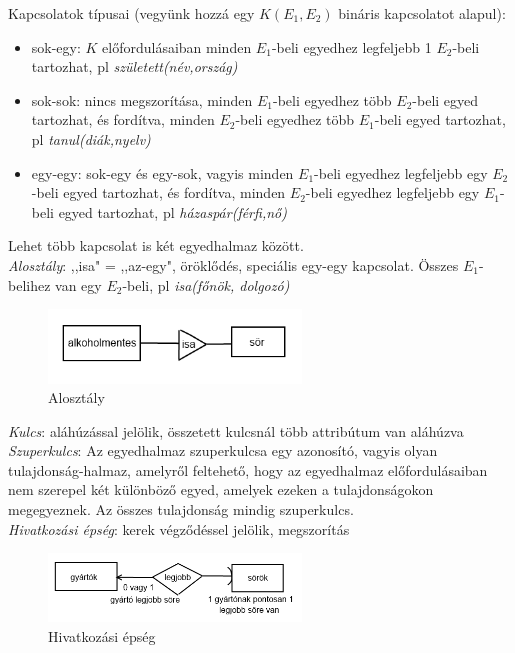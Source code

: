 \documentclass[margin=0px]{article}
\begin{document}
Kapcsolatok típusai (vegyünk hozzá egy $K(E_1,E_2)$ bináris kapcsolatot alapul):
\begin{itemize}
    \item sok-egy: $K$ előfordulásaiban minden $E_1$-beli egyedhez legfeljebb 1 $E_2$-beli tartozhat, pl \textit{született(név,ország)}
    \item sok-sok: nincs megszorítása, minden $E_1$-beli egyedhez több $E_2$-beli egyed tartozhat, és fordítva, minden $E_2$-beli egyedhez több $E_1$-beli egyed tartozhat, pl \textit{tanul(diák,nyelv)}
    \item egy-egy: sok-egy és egy-sok, vagyis minden $E_1$-beli egyedhez legfeljebb egy $E_2$-beli egyed tartozhat, és fordítva, minden $E_2$-beli egyedhez legfeljebb egy $E_1$-beli egyed tartozhat, pl \textit{házaspár(férfi,nő)}
\end{itemize}
Lehet több kapcsolat is két egyedhalmaz között. \\
\textit{Alosztály}: ,,isa" = ,,az-egy", öröklődés, speciális egy-egy kapcsolat. Összes $E_1$-belihez van egy $E_2$-beli, pl \textit{isa(főnök, dolgozó)}
\begin{figure}[H]
    \centering
    \includegraphics[width=0.6\textwidth]{img/ek2.png}
    \caption{Alosztály}
\end{figure}
\textit{Kulcs}: aláhúzással jelölik, összetett kulcsnál több attribútum van aláhúzva \\
\textit{Szuperkulcs}: Az egyedhalmaz szuperkulcsa egy azonosító, vagyis olyan tulajdonság-halmaz, amelyről feltehető, hogy az egyedhalmaz előfordulásaiban nem szerepel két különböző	egyed, amelyek ezeken a tulajdonságokon megegyeznek. Az összes tulajdonság mindig szuperkulcs.\\
\textit{Hivatkozási épség}: kerek végződéssel jelölik, megszorítás
\begin{figure}[H]
    \centering
    \includegraphics[width=0.6\textwidth]{img/ek3.png}
    \caption{Hivatkozási épség}
\end{figure}
\end{document}

